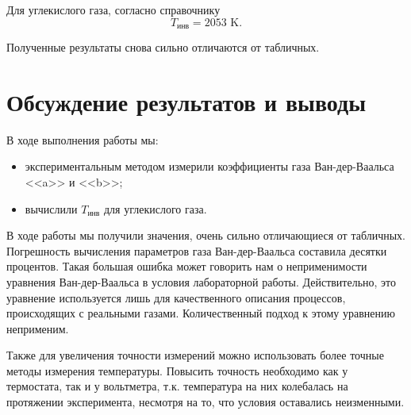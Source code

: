 \documentclass[a4paper,12pt]{article} %
\begin{document}
Для углекислого газа, согласно справочнику  \[ T_\text{инв} = 2053 \text{ K}.\]

Полученные результаты снова сильно отличаются от табличных.

\section*{Обсуждение результатов и выводы}

В ходе выполнения работы мы:

\begin{itemize}
	\item экспериментальным методом измерили коэффициенты газа Ван-дер-Ваальса <<a>> и <<b>>;
	\item вычислили $ T_\text{инв} $ для углекислого газа.
\end{itemize}

В ходе работы мы получили значения, очень сильно отличающиеся от табличных. Погрешность вычисления параметров газа Ван-дер-Ваальса составила десятки процентов. Такая большая ошибка может говорить нам о неприменимости уравнения Ван-дер-Ваальса в условия лабораторной работы. Действительно, это уравнение используется лишь для качественного описания процессов, происходящих с реальными газами. Количественный подход к этому уравнению неприменим.

Также для увеличения точности измерений можно использовать более точные методы измерения температуры. Повысить точность необходимо как у термостата, так и у вольтметра, т.к. температура на них колебалась на протяжении эксперимента, несмотря на то, что условия оставались неизменными.
\end{document}
